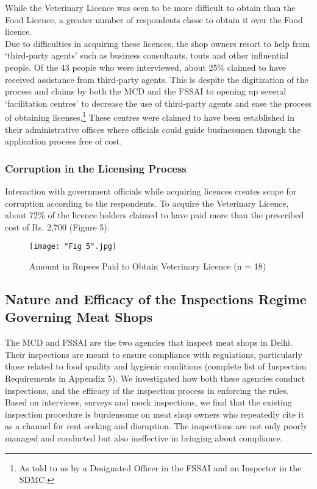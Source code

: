 \documentclass[a4paper, 12pt]{article}
\begin{document}
While the Veterinary Licence was seen to be more difficult to obtain than the Food Licence, a greater number of respondents chose to obtain it over the Food licence. \\

Due to difficulties in acquiring these licences, the shop owners resort to help from ‘third-party agents’ such as business consultants, touts and other influential people. Of the 43 people who were interviewed, about 25\% claimed to have received assistance from third-party agents. This is despite the digitization of the process and claims by both the MCD and the FSSAI to opening up several ‘facilitation centres’ to decrease the use of third-party agents and ease the process of obtaining licenses.\footnote{ As told to us by a Designated Officer in the FSSAI and an Inspector in the SDMC.} These centres were claimed to have been established in their administrative offices where officials could guide businessmen through the application process free of cost. \\

\subsubsection{Corruption in the Licensing Process}

Interaction with government officials while acquiring licences creates scope for corruption according to the respondents. To acquire the Veterinary Licence, about 72\% of the licence holders claimed to have paid more than the prescribed cost of Rs. 2,700 (Figure 5).\\

\begin{figure}[H]
\centering
\texttt{[image: "Fig 5".jpg]}
\caption[Optional Caption]{Amount in Rupees Paid to Obtain Veterinary Licence (n = 18)}
\end{figure} 

\subsection{Nature and Efficacy of the Inspections Regime Governing Meat Shops}

The MCD and FSSAI are the two agencies that inspect meat shops in Delhi. Their inspections are meant to ensure compliance with regulations, particularly those related to food quality and hygienic conditions (complete list of Inspection Requirements in Appendix 5). We investigated how both these agencies conduct inspections, and the efficacy of the inspection process in enforcing the rules. Based on interviews, surveys and mock inspections, we find that the existing inspection procedure is burdensome on meat shop owners who repeatedly cite it as a channel for rent seeking and disruption. The inspections are not only poorly managed and conducted but also ineffective in bringing about compliance. \\
\end{document}
